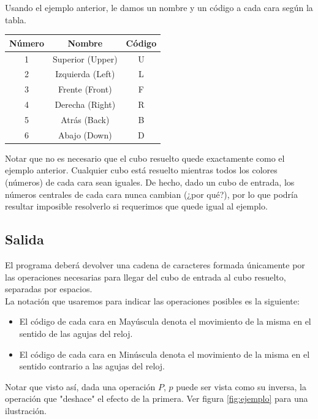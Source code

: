 \documentclass[11pt,a4paper]{article}
\begin{document}
Usando el ejemplo anterior, le damos un nombre y un código a cada cara según la tabla. \\

\begin{center}
\begin{tabular}{| c || c | c |}
\hline 
Número & Nombre & Código \\ \hline
1 & Superior (Upper) & U \\ \hline
2 & Izquierda (Left) & L \\ \hline
3 & Frente (Front) & F \\ \hline
4 & Derecha (Right) & R \\ \hline
5 & Atrás (Back) & B \\ \hline
6 & Abajo (Down) & D \\ \hline
\end{tabular}
\end{center}


Notar que no es necesario que el cubo resuelto quede exactamente como el ejemplo anterior. Cualquier cubo está resuelto mientras todos los colores (números) de cada cara sean iguales. 
De hecho, dado un cubo de entrada, los números centrales de cada cara nunca cambian (¿por qué?), por lo que podría resultar imposible resolverlo si requerimos que quede igual al ejemplo. 


\subsection{Salida}
El programa deberá devolver una cadena de caracteres formada únicamente por las operaciones necesarias para llegar del cubo de entrada al cubo resuelto, separadas por espacios.\\
La notación que usaremos para indicar las operaciones posibles es la siguiente:
\begin{itemize}
\item El código de cada cara en Mayúscula denota el movimiento de la misma en el sentido de las agujas del reloj.
\item El código de cada cara en Minúscula denota el movimiento de la misma en el sentido contrario a las agujas del reloj.
\end{itemize}

Notar que visto así, dada una operación $P$, $p$ puede ser vista como su inversa, la operación que "deshace" el efecto de la primera. Ver figura \ref{fig:ejemplo} para una ilustración. \\
\end{document}
